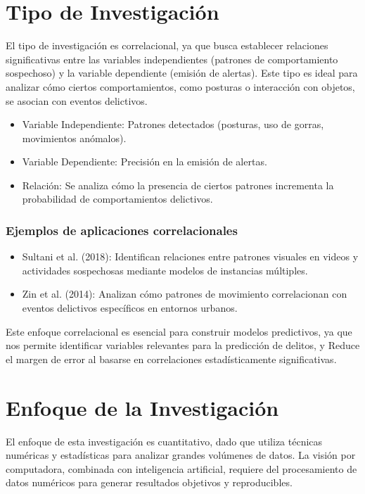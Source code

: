 \section{Tipo de Investigación}
El tipo de investigación es correlacional, ya que busca establecer relaciones significativas entre las variables independientes (patrones de comportamiento sospechoso) y la variable dependiente (emisión de alertas). Este tipo es ideal para analizar cómo ciertos comportamientos, como posturas o interacción con objetos, se asocian con eventos delictivos.

\begin{itemize}
    \item Variable Independiente: Patrones detectados (posturas, uso de gorras, movimientos anómalos).
    \item Variable Dependiente: Precisión en la emisión de alertas.
    \item Relación: Se analiza cómo la presencia de ciertos patrones incrementa la probabilidad de comportamientos delictivos.
\end{itemize}

\subsubsection{Ejemplos de aplicaciones correlacionales}
\begin{itemize}
    \item Sultani et al. (2018): Identifican relaciones entre patrones visuales en videos y actividades sospechosas mediante modelos de instancias múltiples.
    \item Zin et al. (2014): Analizan cómo patrones de movimiento correlacionan con eventos delictivos específicos en entornos urbanos.
\end{itemize}

Este enfoque correlacional es esencial para construir modelos predictivos, ya que nos permite identificar variables relevantes para la predicción de delitos, y Reduce el margen de error al basarse en correlaciones estadísticamente significativas.

\section{Enfoque de la Investigación}
El enfoque de esta investigación es cuantitativo, dado que utiliza técnicas numéricas y estadísticas para analizar grandes volúmenes de datos. La visión por computadora, combinada con inteligencia artificial, requiere del procesamiento de datos numéricos para generar resultados objetivos y reproducibles.

